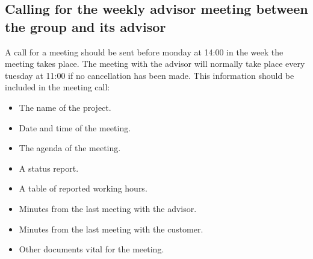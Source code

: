 \subsection{Calling for the weekly advisor meeting between the group and its advisor}
A call for a meeting should be sent before monday at 14:00 in the week the meeting takes place. The meeting with the advisor will normally take place every tuesday at 11:00 if no cancellation has been made.
\newline
\newline
This information should be included in the meeting call:
\begin{itemize}
\item{}The name of the project.
\item{}Date and time of the meeting.
\item{}The agenda of the meeting.
\item{}A status report.
\item{}A table of reported working hours.
\item{}Minutes from the last meeting with the advisor.
\item{}Minutes from the last meeting with the customer.
\item{}Other documents vital for the meeting.
\end{itemize}

